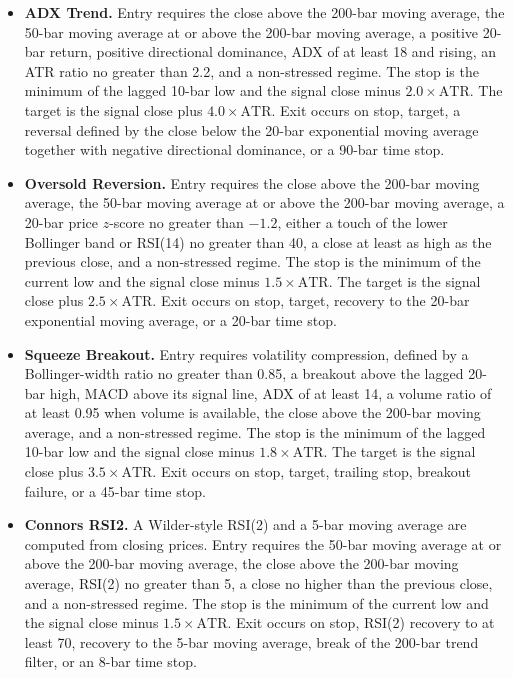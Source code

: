 \documentclass[preprint,12pt]{elsarticle}
\theoremstyle{definition}
\begin{document}
\begin{itemize}
\item \textbf{ADX Trend.} Entry requires the close above the 200-bar moving average, the 50-bar moving average at or above the 200-bar moving average, a positive 20-bar return, positive directional dominance, ADX of at least 18 and rising, an ATR ratio no greater than 2.2, and a non-stressed regime. The stop is the minimum of the lagged 10-bar low and the signal close minus \(2.0\times \mathrm{ATR}\). The target is the signal close plus \(4.0\times \mathrm{ATR}\). Exit occurs on stop, target, a reversal defined by the close below the 20-bar exponential moving average together with negative directional dominance, or a 90-bar time stop.

\item \textbf{Oversold Reversion.} Entry requires the close above the 200-bar moving average, the 50-bar moving average at or above the 200-bar moving average, a 20-bar price \(z\)-score no greater than \(-1.2\), either a touch of the lower Bollinger band or RSI(14) no greater than 40, a close at least as high as the previous close, and a non-stressed regime. The stop is the minimum of the current low and the signal close minus \(1.5\times \mathrm{ATR}\). The target is the signal close plus \(2.5\times \mathrm{ATR}\). Exit occurs on stop, target, recovery to the 20-bar exponential moving average, or a 20-bar time stop.

\item \textbf{Squeeze Breakout.} Entry requires volatility compression, defined by a Bollinger-width ratio no greater than 0.85, a breakout above the lagged 20-bar high, MACD above its signal line, ADX of at least 14, a volume ratio of at least 0.95 when volume is available, the close above the 200-bar moving average, and a non-stressed regime. The stop is the minimum of the lagged 10-bar low and the signal close minus \(1.8\times \mathrm{ATR}\). The target is the signal close plus \(3.5\times \mathrm{ATR}\). Exit occurs on stop, target, trailing stop, breakout failure, or a 45-bar time stop.

\item \textbf{Connors RSI2.} A Wilder-style RSI(2) and a 5-bar moving average are computed from closing prices. Entry requires the 50-bar moving average at or above the 200-bar moving average, the close above the 200-bar moving average, RSI(2) no greater than 5, a close no higher than the previous close, and a non-stressed regime. The stop is the minimum of the current low and the signal close minus \(1.5\times \mathrm{ATR}\). Exit occurs on stop, RSI(2) recovery to at least 70, recovery to the 5-bar moving average, break of the 200-bar trend filter, or an 8-bar time stop.


\end{itemize}
\end{document}
